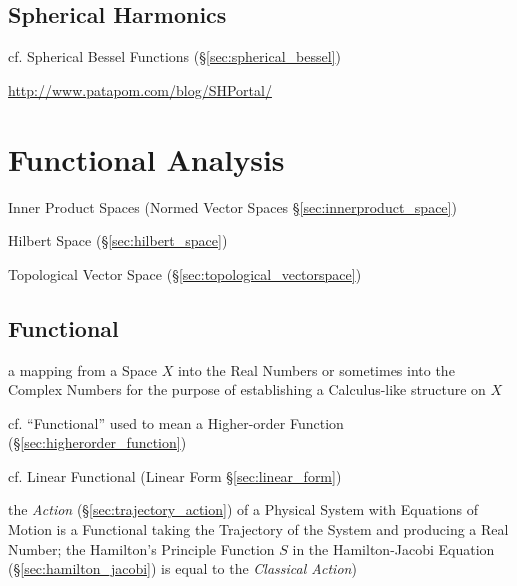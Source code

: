 \subsection{Spherical Harmonics}\label{sec:spherical_harmonics}

\fist cf. Spherical Bessel Functions (\S\ref{sec:spherical_bessel})

\url{http://www.patapom.com/blog/SHPortal/}



\section{Functional Analysis}\label{sec:functional_analysis}

Inner Product Spaces (Normed Vector Spaces
\S\ref{sec:innerproduct_space})

Hilbert Space (\S\ref{sec:hilbert_space})

Topological Vector Space (\S\ref{sec:topological_vectorspace})



\subsection{Functional}\label{sec:functional}

a mapping from a Space $X$ into the Real Numbers or sometimes into the Complex
Numbers for the purpose of establishing a Calculus-like structure on $X$

\fist cf. ``Functional'' used to mean a Higher-order Function
(\S\ref{sec:higherorder_function})

\fist cf. Linear Functional (Linear Form \S\ref{sec:linear_form})

the \emph{Action} (\S\ref{sec:trajectory_action}) of a Physical System with
Equations of Motion is a Functional taking the Trajectory of the System and
producing a Real Number; the Hamilton's Principle Function $S$ in the
Hamilton-Jacobi Equation (\S\ref{sec:hamilton_jacobi}) is equal to the
\emph{Classical Action})



